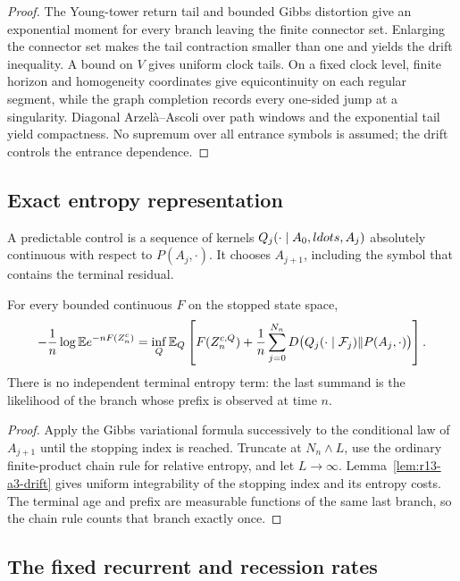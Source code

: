 \begin{proof}
The Young-tower return tail and bounded Gibbs distortion give an exponential
moment for every branch leaving the finite connector set.  Enlarging the
connector set makes the tail contraction smaller than one and yields the
drift inequality.  A bound on $V$ gives uniform clock tails.  On a fixed
clock level, finite horizon and homogeneity coordinates give equicontinuity on
each regular segment, while the graph completion records every one-sided jump
at a singularity.  Diagonal Arzelà--Ascoli over path windows and the
exponential tail yield compactness.  No supremum over all entrance symbols is
assumed; the drift controls the entrance dependence.
\end{proof}

\subsection{Exact entropy representation}

A predictable control is a sequence of kernels
$Q_j(\cdot\mid A_0,\\ldots,A_j)$ absolutely continuous with respect to
$P(A_j,\cdot)$.  It chooses $A_{j+1}$, including the symbol that contains the
terminal residual.

\begin{theorem}
\label{thm:r13-a3-control}
For every bounded continuous $F$ on the stopped state space,
\[
 -{1\over n}\log\mathbb E e^{-nF(Z_n^c)}
 =\inf_Q\mathbb E_Q\left[
 F(Z_n^{c,Q})+{1\over n}
 \sum_{j=0}^{N_n}
 D\bigl(Q_j(\cdot\mid\mathcal F_j)\Vert P(A_j,\cdot)\bigr)
 \right].
\]
There is no independent terminal entropy term: the last summand is the
likelihood of the branch whose prefix is observed at time $n$.
\end{theorem}

\begin{proof}
Apply the Gibbs variational formula successively to the conditional law of
$A_{j+1}$ until the stopping index is reached.  Truncate at
$N_n\wedge L$, use the ordinary finite-product chain rule for relative
entropy, and let $L\to\infty$.  Lemma~\ref{lem:r13-a3-drift} gives uniform
integrability of the stopping index and its entropy costs.  The terminal age
and prefix are measurable functions of the same last branch, so the chain
rule counts that branch exactly once.
\end{proof}

\subsection{The fixed recurrent and recession rates}

